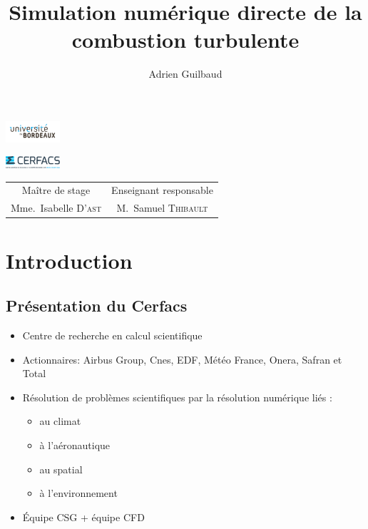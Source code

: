 \documentclass{beamer}
\author{Adrien Guilbaud}
\title{Simulation numérique directe de la combustion turbulente}
\begin{document}
 \AtBeginSection[]
{
  \begin{frame}
    \tableofcontents[currentsection]
	\addtocounter{framenumber}{-1}

  \end{frame}
}

\begin{frame}[plain]
    \parbox[c]{-50cm}{\centering%
      \includegraphics[width=2cm]{figures/logo_fac.jpg}%
    }%
    \parbox[c]{19.5cm}{\centering%
      \includegraphics[width=2cm]{figures/logo_cerfacs.eps}
    }%
\maketitle

\centering
\footnotesize
\begin{tabular}{cc}
  Maître de stage & Enseignant responsable \\
  Mme.~Isabelle \textsc{D'ast} &   M.~Samuel \textsc{Thibault} \\
\end{tabular}
\end{frame}

%
%

\section{Introduction}
\subsection{Présentation du Cerfacs}
\begin{frame}
  \begin{itemize}
  \item Centre de recherche en calcul scientifique
  \item Actionnaires: Airbus Group, Cnes, EDF, Météo France, Onera, Safran et Total
    
  \item Résolution de problèmes scientifiques par la résolution numérique liés :
    \begin{itemize}
    \item au climat
    \item à l'aéronautique
    \item au spatial
    \item à l'environnement
    \end{itemize}
  \item Équipe CSG + équipe CFD
  \end{itemize}
\end{frame}
\end{document}

